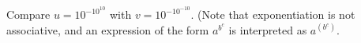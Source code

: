Compare $u=10^{-10^{10}}$ with $v=10^{-10^{-10}}$. (Note that exponentiation is
not associative, and an expression of the form $a^{b^c}$ is interpreted
as $a^{(b^c)}$.
